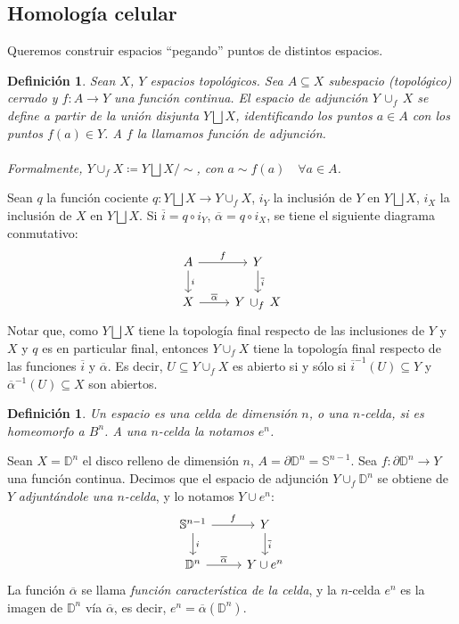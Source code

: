 \documentclass[12pt,a4paper]{article}
\newtheorem{definition}[theorem]{Definición}
\begin{document}
\subsection{Homología celular}
Queremos construir espacios ``pegando'' puntos de distintos espacios.
\begin{definition}
    Sean $X$, $Y$ espacios topológicos. Sea $A \subseteq X$ subespacio (topológico) cerrado y $f: A \rightarrow Y$ una función continua. El espacio de adjunción $Y \, \cup_f \, X$ se define a partir de la unión disjunta $Y \bigsqcup X$, identificando los puntos $a \in A$ con los puntos $f(a) \in Y$. A $f$ la llamamos función de adjunción.
    \\
    \\
    Formalmente, $Y \cup_f X \coloneqq Y \bigsqcup X /\sim$, con $a \sim f(a) \quad \forall a \in A$.
\end{definition}
Sean $q$ la función cociente $q: Y \bigsqcup X \rightarrow Y \cup_f X$, $i_Y$ la inclusión de $Y$ en $Y \bigsqcup X$, $i_X$ la inclusión de $X$ en $Y \bigsqcup X$. Si $\overline{i} = q \circ i_Y$, $\overline{\alpha} = q \circ i_X$, se tiene el siguiente diagrama conmutativo:
\[
\begin{tikzcd}
A \arrow[r, "f"] \arrow[d, "i"] & Y \arrow[d, "\overline{i}"] \\
X \arrow[r, "\overline{\alpha}"]           & Y \, \cup_f \, X
\end{tikzcd}
\]
Notar que, como $Y \bigsqcup X$ tiene la topología final respecto de las inclusiones de $Y$ y $X$ y $q$ es en particular final, entonces $Y \cup_f X$ tiene la topología final respecto de las funciones $\overline{i}$ y $\overline{\alpha}$. Es decir, $U \subseteq Y \cup_f X$ es abierto si y sólo si $\overline{i}^{-1}(U) \subseteq Y$ y $\overline{\alpha}^{-1}(U) \subseteq X$ son abiertos.
\begin{definition}
Un espacio es una \textit{celda} de dimensión $n$, o una $n$-celda, si es homeomorfo a $B^n$. A una $n$-celda la notamos $e^n$.
\end{definition}
Sean $X = \mathbb{D}^n$ el disco relleno de dimensión $n$, $A = \partial \mathbb{D}^n = \mathbb{S}^{n-1}$. Sea $f: \partial \mathbb{D}^n \rightarrow Y$ una función continua. Decimos que el espacio de adjunción $Y \cup_f \mathbb{D}^n$ se obtiene de $Y$ \textit{adjuntándole una $n$-celda}, y lo notamos $Y \cup e^n$:
\[
\begin{tikzcd}
\mathbb{S}^{n-1} \arrow[r, "f"] \arrow[d, "i"] & Y \arrow[d, "\overline{i}"] \\
\mathbb{D}^n \arrow[r, "\overline{\alpha}"]           & Y \cup e^n
\end{tikzcd}
\]
La función $\overline{\alpha}$ se llama \textit{función característica de la celda}, y la $n$-celda $e^n$ es la imagen de $\mathbb{D}^n$ vía $\overline{\alpha}$, es decir, $e^n = \overline{\alpha}(\mathbb{D}^n)$.
\\
\end{document}
